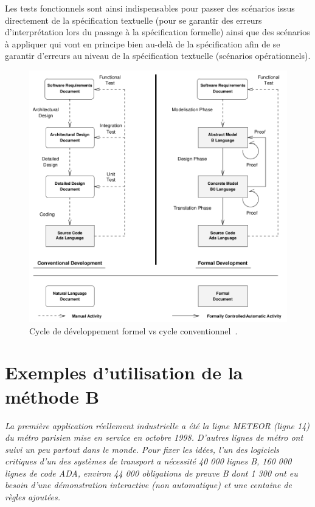 \documentclass[10pt,a4paper]{article}
\begin{document}
{Les tests fonctionnels sont ainsi indispensables pour passer des scénarios issus directement de la spécification textuelle (pour se garantir des erreurs d'interprétation lors du passage à la spécification formelle) ainsi que des scénarios à appliquer qui vont en principe bien au-delà de la spécification afin de se garantir d'erreurs au niveau de la spécification textuelle (scénarios opérationnels).

\begin{figure}[h]
\centering
\includegraphics[scale=0.45]{ressources/formal_dev.png}
\caption{\label{DifferentsCycles}
Cycle de développement formel vs cycle conventionnel~\cite[page 374]{behm1999meteor}.}
\end{figure}

\section{Exemples d'utilisation de la méthode B}

\emph{La première application réellement industrielle a été la ligne METEOR (ligne 14) du métro parisien mise en service en octobre 1998. D'autres lignes de métro ont suivi un peu partout dans le monde. Pour fixer les idées, l'un des logiciels critiques d'un des systèmes de transport a nécessité 40 000 lignes B, 160 000 lignes de code ADA, environ 44 000 obligations de preuve B dont 1 300 ont eu besoin d'une démonstration interactive (non automatique) et une centaine de règles ajoutées.}\cite{dossierTechnique}

}
\end{document}
